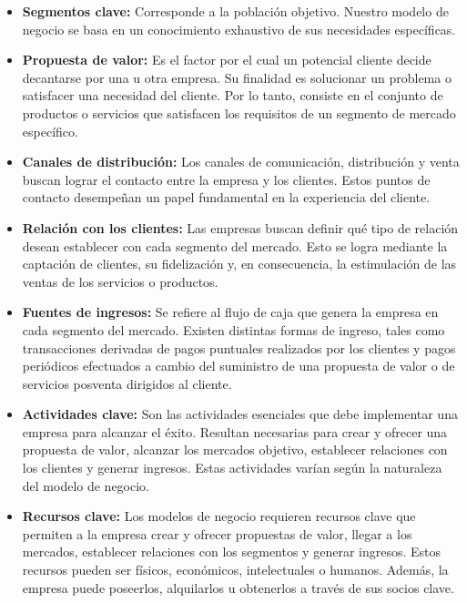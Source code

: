 \begin{itemize}
	\item \textbf{Segmentos clave:} Corresponde a la población objetivo. Nuestro modelo de negocio se basa en un conocimiento exhaustivo de sus necesidades específicas.
	
	\item \textbf{Propuesta de valor:} Es el factor por el cual un potencial cliente decide decantarse por una u otra empresa. Su finalidad es solucionar un problema o satisfacer una necesidad del cliente. Por lo tanto, consiste en el conjunto de productos o servicios que satisfacen los requisitos de un segmento de mercado específico.
	
	\item \textbf{Canales de distribución:} Los canales de comunicación, distribución y venta buscan lograr el contacto entre la empresa y los clientes. Estos puntos de contacto desempeñan un papel fundamental en la experiencia del cliente.
	
	\item \textbf{Relación con los clientes:} Las empresas buscan definir qué tipo de relación desean establecer con cada segmento del mercado. Esto se logra mediante la captación de clientes, su fidelización y, en consecuencia, la estimulación de las ventas de los servicios o productos.
	
	\item \textbf{Fuentes de ingresos:} Se refiere al flujo de caja que genera la empresa en cada segmento del mercado. Existen distintas formas de ingreso, tales como transacciones derivadas de pagos puntuales realizados por los clientes y pagos periódicos efectuados a cambio del suministro de una propuesta de valor o de servicios posventa dirigidos al cliente.
	
	\item \textbf{Actividades clave:} Son las actividades esenciales que debe implementar una empresa para alcanzar el éxito. Resultan necesarias para crear y ofrecer una propuesta de valor, alcanzar los mercados objetivo, establecer relaciones con los clientes y generar ingresos. Estas actividades varían según la naturaleza del modelo de negocio.
	
	\item \textbf{Recursos clave:} Los modelos de negocio requieren recursos clave que permiten a la empresa crear y ofrecer propuestas de valor, llegar a los mercados, establecer relaciones con los segmentos y generar ingresos. Estos recursos pueden ser físicos, económicos, intelectuales o humanos. Además, la empresa puede poseerlos, alquilarlos u obtenerlos a través de sus socios clave.
	

\end{itemize}
